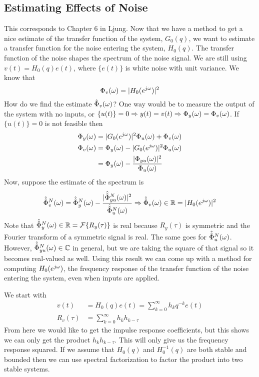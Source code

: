 \subsection{Estimating Effects of Noise}
This corresponds to Chapter 6 in Ljung.
Now that we have a method to get a nice estimate of the transfer function of the system, $G_0(q)$, we want to estimate a transfer function for the noise entering the system, $H_0(q)$.
The transfer function of the noise shapes the spectrum of the noise signal.
We are still using $v(t) = H_0(q)e(t)$, where $\{e(t)\}$ is white noise with unit variance.
We know that
$$\Phi_v(\omega) = |H_0(e^{j\omega})|^2$$
How do we find the estimate $\hat{\Phi}_v(\omega)$? One way would be to measure the output of the system with no inputs, or $\{u(t)\}=0 \Rightarrow y(t) = v(t) \Rightarrow \Phi_y(\omega) = \Phi_v(\omega)$.
If $\{u(t)\}=0$ is not feasible then
\begin{align*}
\Phi_y(\omega) &= |G_0(e^{j\omega})|^2\Phi_u(\omega) + \Phi_v(\omega) \\
\Phi_v(\omega) &= \Phi_y(\omega) - |G_0(e^{j\omega})|^2\Phi_u(\omega) \\
&= \Phi_y(\omega) - \frac{|\Phi_{yu}(\omega)|^2}{\Phi_u(\omega)}
\end{align*}
Now, suppose the estimate of the spectrum is
\begin{align*}
\hat{\hat{\Phi}}_v^N(\omega) = \hat{\hat{\Phi}}_y^N (\omega) - \frac{|\hat{\hat{\Phi}}_{yu}^N (\omega)|^2}{\hat{\hat{\Phi}}_u^N (\omega)} \Rightarrow \hat{\hat{\Phi}}_v(\omega)\in\mathbb{R} = |H_0(e^{j\omega})|^2
\end{align*}
Note that $\hat{\hat{\Phi}}_y^N (\omega)\in\mathbb{R} = \mathcal{F}\{R_y(\tau)\}$ is real because $R_y(\tau)$ is symmetric and the Fourier transform of a symmetric signal is real.
The same goes for $\hat{\hat{\Phi}}_u^N (\omega)$.
However, $\hat{\hat{\Phi}}_{yu}^N (\omega)\in\mathbb{C}$ in general, but we are taking the square of that signal so it becomes real-valued as well.
Using this result we can come up with a method for computing $H_0(e^{j\omega})$, the frequency response of the transfer function of the noise entering the system, even when inputs are applied.

We start with
\begin{align*}
v(t) &= H_0(q)e(t) = \sum_{k=0}^\infty h_k q^{-k}e(t) \\
R_v(\tau) &= \sum_{k=0}^\infty h_k h_{k-\tau}
\end{align*}
From here we would like to get the impulse response coefficients, but this shows we can only get the product $h_k h_{k-\tau}$.
This will only give us the frequency response squared.
If we assume that $H_0(q)$ and $H_0^{-1}(q)$ are both stable and bounded then we can use spectral factorization to factor the product into two stable systems.

